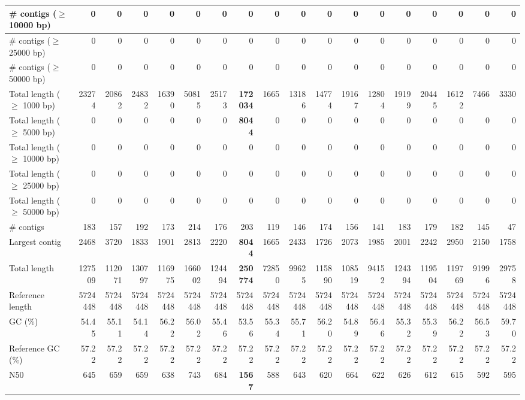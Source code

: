 \documentclass[12pt,a4paper]{article}
\begin{document}
\begin{table}[ht]
\begin{center}
\begin{tabular}{|l*{17}{|r}|}
\# contigs ($\geq$ 10000 bp) & 0 & 0 & 0 & 0 & 0 & 0 & 0 & 0 & 0 & 0 & 0 & 0 & 0 & 0 & 0 & 0 & 0 \\ \hline
\# contigs ($\geq$ 25000 bp) & 0 & 0 & 0 & 0 & 0 & 0 & 0 & 0 & 0 & 0 & 0 & 0 & 0 & 0 & 0 & 0 & 0 \\ \hline
\# contigs ($\geq$ 50000 bp) & 0 & 0 & 0 & 0 & 0 & 0 & 0 & 0 & 0 & 0 & 0 & 0 & 0 & 0 & 0 & 0 & 0 \\ \hline
Total length ($\geq$ 1000 bp) & 23274 & 20862 & 24832 & 16390 & 50815 & 25173 & {\bf 172034} & 1665 & 13186 & 14774 & 19167 & 12804 & 19199 & 20445 & 16122 & 7466 & 3330 \\ \hline
Total length ($\geq$ 5000 bp) & 0 & 0 & 0 & 0 & 0 & 0 & {\bf 8044} & 0 & 0 & 0 & 0 & 0 & 0 & 0 & 0 & 0 & 0 \\ \hline
Total length ($\geq$ 10000 bp) & 0 & 0 & 0 & 0 & 0 & 0 & 0 & 0 & 0 & 0 & 0 & 0 & 0 & 0 & 0 & 0 & 0 \\ \hline
Total length ($\geq$ 25000 bp) & 0 & 0 & 0 & 0 & 0 & 0 & 0 & 0 & 0 & 0 & 0 & 0 & 0 & 0 & 0 & 0 & 0 \\ \hline
Total length ($\geq$ 50000 bp) & 0 & 0 & 0 & 0 & 0 & 0 & 0 & 0 & 0 & 0 & 0 & 0 & 0 & 0 & 0 & 0 & 0 \\ \hline
\# contigs & 183 & 157 & 192 & 173 & 214 & 176 & 203 & 119 & 146 & 174 & 156 & 141 & 183 & 179 & 182 & 145 & 47 \\ \hline
Largest contig & 2468 & 3720 & 1833 & 1901 & 2813 & 2220 & {\bf 8044} & 1665 & 2433 & 1726 & 2073 & 1985 & 2001 & 2242 & 2950 & 2150 & 1758 \\ \hline
Total length & 127509 & 112071 & 130797 & 116975 & 166002 & 124494 & {\bf 250774} & 72850 & 99625 & 115890 & 108519 & 94152 & 124394 & 119504 & 119769 & 91996 & 29758 \\ \hline
Reference length & 5724448 & 5724448 & 5724448 & 5724448 & 5724448 & 5724448 & 5724448 & 5724448 & 5724448 & 5724448 & 5724448 & 5724448 & 5724448 & 5724448 & 5724448 & 5724448 & 5724448 \\ \hline
GC (\%) & 54.45 & 55.11 & 54.14 & 56.22 & 56.02 & 55.46 & 53.56 & 55.34 & 55.71 & 56.20 & 54.89 & 56.46 & 55.32 & 55.39 & 56.22 & 56.53 & 59.70 \\ \hline
Reference GC (\%) & 57.22 & 57.22 & 57.22 & 57.22 & 57.22 & 57.22 & 57.22 & 57.22 & 57.22 & 57.22 & 57.22 & 57.22 & 57.22 & 57.22 & 57.22 & 57.22 & 57.22 \\ \hline
N50 & 645 & 659 & 659 & 638 & 743 & 684 & {\bf 1567} & 588 & 643 & 620 & 664 & 622 & 626 & 612 & 615 & 592 & 595 \\ \hline

\end{tabular}
\end{center}
\end{table}
\end{document}
